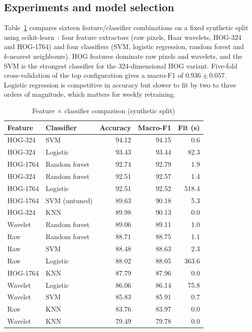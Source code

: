 \documentclass[conference]{IEEEtran}
\begin{document}
\subsection{Experiments and model selection}
Table~\ref{tab:grid} compares sixteen feature/classifier combinations on a fixed
synthetic split using scikit-learn~\cite{pedregosa2011sklearn}: four feature
extractors (raw pixels, Haar wavelets, HOG-324 and HOG-1764) and four classifiers
(SVM, logistic regression, random forest and $k$-nearest neighbours). HOG
features dominate raw pixels and wavelets, and the SVM is the strongest
classifier for the 324-dimensional HOG variant. Five-fold cross-validation of the
top configuration gives a macro-F1 of $0.936\pm0.057$. Logistic regression is
competitive in accuracy but slower to fit by two to three orders of magnitude,
which matters for weekly retraining.

\begin{table}[t]
\centering
\caption{Feature $\times$ classifier comparison (synthetic split)}
\label{tab:grid}
\setlength{\tabcolsep}{4pt}
\begin{tabular}{@{}llrrr@{}}
\toprule
Feature & Classifier & Accuracy & Macro-F1 & Fit (s) \\
\midrule
HOG-324 & SVM & 94.12 & 94.15 & 0.6 \\
HOG-324 & Logistic & 93.43 & 93.44 & 82.3 \\
HOG-1764 & Random forest & 92.74 & 92.79 & 1.9 \\
HOG-324 & Random forest & 92.51 & 92.57 & 1.4 \\
HOG-1764 & Logistic & 92.51 & 92.52 & 518.4 \\
HOG-1764 & SVM (untuned) & 89.63 & 90.18 & 5.3 \\
HOG-324 & KNN & 89.98 & 90.13 & 0.0 \\
Wavelet & Random forest & 89.06 & 89.11 & 1.0 \\
Raw & Random forest & 88.71 & 88.75 & 1.1 \\
Raw & SVM & 88.48 & 88.63 & 2.3 \\
Raw & Logistic & 88.02 & 88.05 & 363.6 \\
HOG-1764 & KNN & 87.79 & 87.96 & 0.0 \\
Wavelet & Logistic & 86.06 & 86.14 & 75.8 \\
Wavelet & SVM & 85.83 & 85.91 & 0.7 \\
Raw & KNN & 83.76 & 83.97 & 0.0 \\
Wavelet & KNN & 79.49 & 79.78 & 0.0 \\
\bottomrule
\end{tabular}
\end{table}
\end{document}
